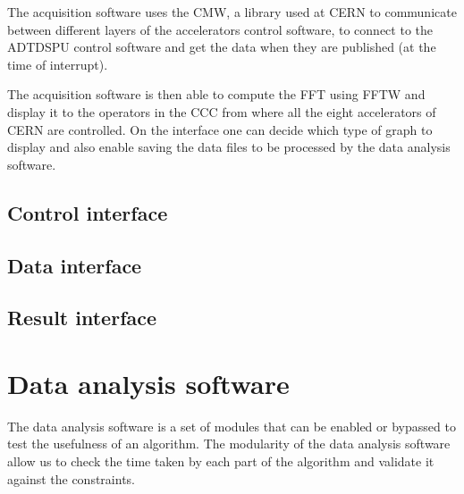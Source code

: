The acquisition software uses the \gls{CMW}, a library used at \gls{CERN} to communicate between different layers of the accelerators control software, to connect to the \gls{ADTDSPU} control software and get the data when they are published (at the time of interrupt).

The acquisition software is then able to compute the \gls{FFT} using \gls{FFTW} and display it to the operators in the \gls{CCC} from where all the eight accelerators of \gls{CERN} are controlled. On the interface one can decide which type of graph to display and also enable saving the data files to be processed by the data analysis software.

\subsection{Control interface}
\subsection{Data interface}
\subsection{Result interface}

\section{Data analysis software}
\label{sec:data_analysis_software}

The data analysis software is a set of modules that can be enabled or bypassed to test the usefulness of an algorithm. The modularity of the data analysis software allow us to check the time taken by each part of the algorithm and validate it against the constraints.

